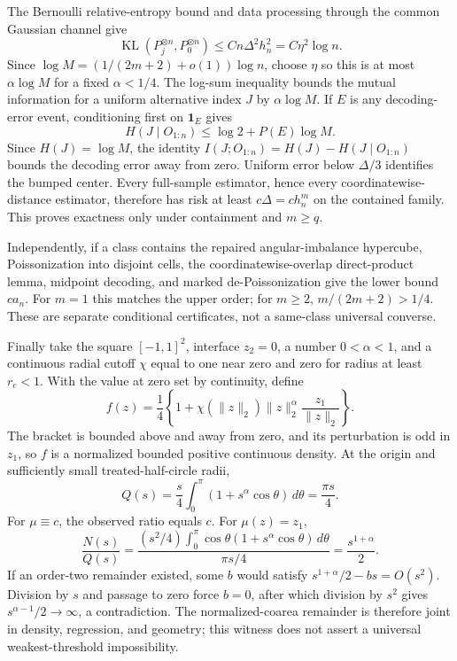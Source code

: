 The Bernoulli relative-entropy bound and data processing through the common
Gaussian channel give
\[
 \operatorname{KL}(P_j^{\otimes n},P_0^{\otimes n})
 \leq Cn\Delta^2h_n^2=C\eta^2\log n.
\]
Since \(\log M=(1/(2m+2)+o(1))\log n\), choose \(\eta\) so this is at most
\(\alpha\log M\) for a fixed \(\alpha<1/4\).  The log-sum inequality bounds
the mutual information for a uniform alternative index \(J\) by
\(\alpha\log M\).  If \(E\) is any decoding-error event, conditioning first
on \(\mathbf1_E\) gives
\[
 H(J\mid O_{1:n})\leq\log2+P(E)\log M.
\]
Since \(H(J)=\log M\), the identity
\(I(J;O_{1:n})=H(J)-H(J\mid O_{1:n})\) bounds the decoding error away from
zero.
Uniform error below \(\Delta/3\) identifies the bumped center.  Every
full-sample estimator, hence every coordinatewise-distance estimator, therefore
has risk at least \(c\Delta=ch_n^m\) on the contained family.  This proves
exactness only under containment and \(m\geq q\).

Independently, if a class contains the repaired angular-imbalance hypercube,
Poissonization into disjoint cells, the coordinatewise-overlap direct-product
lemma, midpoint decoding, and marked de-Poissonization give the lower bound
\(ca_n\).  For \(m=1\) this matches the upper order; for \(m\geq2\),
\(m/(2m+2)>1/4\).  These are separate conditional certificates, not a
same-class universal converse.

Finally take the square \([-1,1]^2\), interface \(z_2=0\), a number
\(0<\alpha<1\), and a continuous radial cutoff \(\chi\) equal to one near
zero and zero for radius at least \(r_c<1\).  With the value at zero set by
continuity, define
\[
 f(z)=\frac14\left\{1+\chi(\lVert z\rVert_2)
 \lVert z\rVert_2^\alpha\frac{z_1}{\lVert z\rVert_2}\right\}.
\]
The bracket is bounded above and away from zero, and its perturbation is odd in
\(z_1\), so \(f\) is a normalized bounded positive continuous density.  At
the origin and sufficiently small treated-half-circle radii,
\[
 Q(s)=\frac s4\int_0^\pi(1+s^\alpha\cos\theta)\,d\theta
 =\frac{\pi s}{4}.
\]
For \(\mu\equiv c\), the observed ratio equals \(c\).  For
\(\mu(z)=z_1\),
\[
 \frac{N(s)}{Q(s)}
 =\frac{(s^2/4)\int_0^\pi\cos\theta(1+s^\alpha\cos\theta)\,d\theta}
 {\pi s/4}=\frac{s^{1+\alpha}}2.
\]
If an order-two remainder existed, some \(b\) would satisfy
\(s^{1+\alpha}/2-bs=O(s^2)\).  Division by \(s\) and passage to zero force
\(b=0\), after which division by \(s^2\) gives
\(s^{\alpha-1}/2\to\infty\), a contradiction.  The normalized-coarea
remainder is therefore joint in density, regression, and geometry; this witness
does not assert a universal weakest-threshold impossibility.
